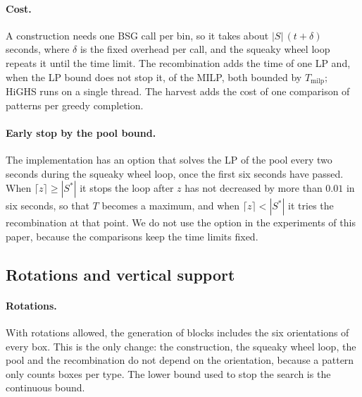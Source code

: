 \paragraph{Cost.}
A construction needs one BSG call per bin, so it takes about $|S|\,(t+\delta)$ seconds, where
$\delta$ is the fixed overhead per call, and the squeaky wheel loop repeats it until the time
limit. The recombination adds the time of one LP and, when the LP bound does not stop it, of the
MILP, both bounded by $T_{\mathrm{milp}}$; HiGHS \citep{Huangfu2018} runs on a single thread.
The harvest adds the cost of one comparison of patterns per greedy completion.

\paragraph{Early stop by the pool bound.}
The implementation has an option that solves the LP of the pool every two seconds during the
squeaky wheel loop, once the first six seconds have passed. When $\lceil z\rceil\ge|S^*|$ it stops
the loop after $z$ has not decreased by more than $0.01$ in six seconds, so that $T$ becomes a
maximum, and when $\lceil z\rceil<|S^*|$ it tries the recombination at that point. We do not use the option in
the experiments of this paper, because the comparisons keep the time limits fixed.

\subsection{Rotations and vertical support}
\label{sec:m-ext}

\paragraph{Rotations.}
With rotations allowed, the generation of blocks includes the six orientations of every box. This
is the only change: the construction, the squeaky wheel loop, the pool and the recombination do
not depend on the orientation, because a pattern only counts boxes per type. The lower bound
used to stop the search is the continuous bound.

